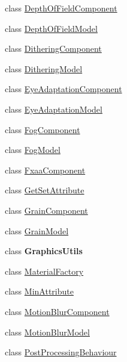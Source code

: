 \begin{DoxyCompactItemize}
\item 
class \mbox{\hyperlink{class_unity_engine_1_1_post_processing_1_1_depth_of_field_component}{Depth\+Of\+Field\+Component}}
\item 
class \mbox{\hyperlink{class_unity_engine_1_1_post_processing_1_1_depth_of_field_model}{Depth\+Of\+Field\+Model}}
\item 
class \mbox{\hyperlink{class_unity_engine_1_1_post_processing_1_1_dithering_component}{Dithering\+Component}}
\item 
class \mbox{\hyperlink{class_unity_engine_1_1_post_processing_1_1_dithering_model}{Dithering\+Model}}
\item 
class \mbox{\hyperlink{class_unity_engine_1_1_post_processing_1_1_eye_adaptation_component}{Eye\+Adaptation\+Component}}
\item 
class \mbox{\hyperlink{class_unity_engine_1_1_post_processing_1_1_eye_adaptation_model}{Eye\+Adaptation\+Model}}
\item 
class \mbox{\hyperlink{class_unity_engine_1_1_post_processing_1_1_fog_component}{Fog\+Component}}
\item 
class \mbox{\hyperlink{class_unity_engine_1_1_post_processing_1_1_fog_model}{Fog\+Model}}
\item 
class \mbox{\hyperlink{class_unity_engine_1_1_post_processing_1_1_fxaa_component}{Fxaa\+Component}}
\item 
class \mbox{\hyperlink{class_unity_engine_1_1_post_processing_1_1_get_set_attribute}{Get\+Set\+Attribute}}
\item 
class \mbox{\hyperlink{class_unity_engine_1_1_post_processing_1_1_grain_component}{Grain\+Component}}
\item 
class \mbox{\hyperlink{class_unity_engine_1_1_post_processing_1_1_grain_model}{Grain\+Model}}
\item 
class {\bfseries Graphics\+Utils}
\item 
class \mbox{\hyperlink{class_unity_engine_1_1_post_processing_1_1_material_factory}{Material\+Factory}}
\item 
class \mbox{\hyperlink{class_unity_engine_1_1_post_processing_1_1_min_attribute}{Min\+Attribute}}
\item 
class \mbox{\hyperlink{class_unity_engine_1_1_post_processing_1_1_motion_blur_component}{Motion\+Blur\+Component}}
\item 
class \mbox{\hyperlink{class_unity_engine_1_1_post_processing_1_1_motion_blur_model}{Motion\+Blur\+Model}}
\item 
class \mbox{\hyperlink{class_unity_engine_1_1_post_processing_1_1_post_processing_behaviour}{Post\+Processing\+Behaviour}}

\end{DoxyCompactItemize}
